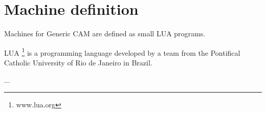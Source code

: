 \chapter{Machine definition}

Machines for Generic CAM are defined as small LUA programs.


LUA \footnote{www.lua.org} is a programming language developed by a team from the
Pontifical Catholic University of Rio de Janeiro in Brazil.


...